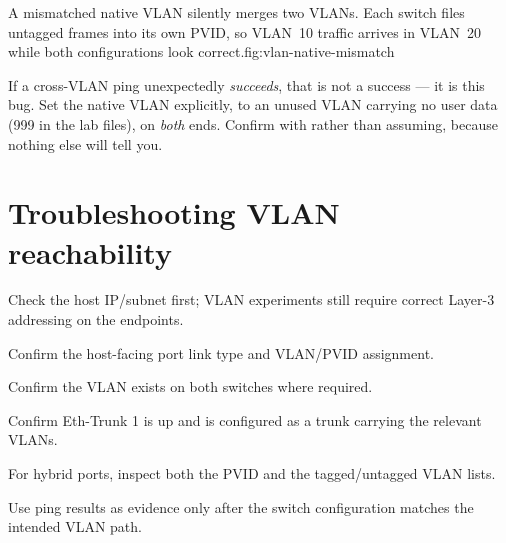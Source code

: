 \begin{utpfig}{A mismatched native VLAN silently merges two VLANs. Each switch files untagged frames into its own PVID, so VLAN~10 traffic arrives in VLAN~20 while both configurations look correct.}{fig:vlan-native-mismatch}
\end{utpfig}

\begin{pitfall}
If a cross-VLAN ping unexpectedly \emph{succeeds}, that is not a success --- it is this bug. Set the native VLAN explicitly, to an unused VLAN carrying no user data (999 in the lab files), on \emph{both} ends. Confirm with  rather than assuming, because nothing else will tell you.
\end{pitfall}

\section{Troubleshooting VLAN reachability}
\begin{utpsteps}
\item Check the host IP/subnet first; VLAN experiments still require correct Layer-3 addressing on the endpoints.
\item Confirm the host-facing port link type and VLAN/PVID assignment.
\item Confirm the VLAN exists on both switches where required.
\item Confirm Eth-Trunk 1 is up and is configured as a trunk carrying the relevant VLANs.
\item For hybrid ports, inspect both the PVID and the tagged/untagged VLAN lists.
\item Use ping results as evidence only after the switch configuration matches the intended VLAN path.
\end{utpsteps}

